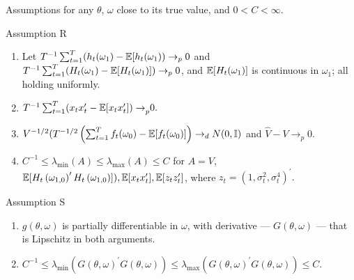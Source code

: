 \documentclass[smaller, aspectratio=169]{beamer}
\begin{document}
\begin{frame}[c]{Assumptions for any $\theta$, $\omega$ close to its true value, and $ 0 < C < \infty$.}

  \begin{block}{Assumption R}
    \label{assump:R}
%    
    \begin{enumerate}
      \item Let $T^{-1}\sum_{t=1}^{T}(h_{t}(\omega_{1})-\mathbb{E}[ h_{t}(\omega_{1}))\rightarrow_{p}0$ and $T^{-1}\sum_{t=1}^{T}(H_{t}(\omega_{1})-\mathbb{E}[H_{t}(\omega_{1})])\rightarrow_{p}0$, and $\mathbb{E}[H_{t}(\omega_{1})]$ is continuous in $\omega_{1}$; all holding uniformly.
%
      \item $T^{-1}\sum_{t=1}^{T}(x_{t}x_{t}^{\prime}-\mathbb{E}[ x_{t}x_{t}^{\prime}{])\rightarrow}_{p}0.$
%
      \item $V^{-1/2} (T^{-1/2}\left(\sum_{t=1}^{T}f_{t}(\omega_{0})-\mathbb{E}[f_{t}(\omega_{0})]\right) \rightarrow_{d} N(0, \mathbb{I})$ and $\widehat{V} -V\rightarrow_{p}0.$
%
      \item $C^{-1}\leq \lambda_{\min}(A)\leq \lambda_{\max}(A)\leq C$ for $A = V$, $\mathbb{E}[H_{t}\left(\omega_{1, 0}\right)^{\prime}H_{t}\left(\omega_{1, 0}\right) ]), \mathbb{E}[x_{t}x_{t}^{\prime}], \mathbb{E}[ z_{t}z_{t}^{\prime}]$, where $z_{t} = (1, \sigma_{t}^{2}, \sigma_{t}^{4})^{\prime}.$
%
    \end{enumerate}
  \end{block}
  
  \vfill

  \begin{block}{Assumption S}
%
    \begin{enumerate}
      \item $g(\theta, \omega)$ is partially differentiable in $\omega$, with derivative --- $G(\theta, \omega)$ --- that is Lipschitz in both arguments. 
      \item $C^{-1} \leq \lambda_{\min}(G(\theta, \omega)^{\prime}G(\theta, \omega)) \leq \lambda_{\max}(G(\theta, \omega)^{\prime}G(\theta, \omega)) \leq C$.
    \end{enumerate}

  \end{block}

\end{frame}
\end{document}
